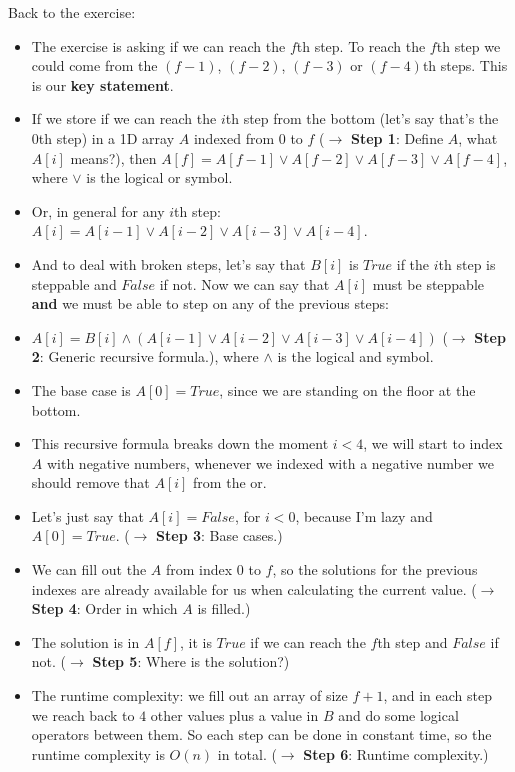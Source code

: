 Back to the exercise:

\begin{itemize}
    \item The exercise is asking if we can reach the $f$th step. To reach the $f$th step we could come from the $(f-1)$, $(f-2)$, $(f-3)$ or $(f-4)$th steps. This is our \textbf{key statement}.
    \item If we store if we can reach the $i$th step from the bottom (let's say that's the 0th step) in a 1D array $A$ indexed from $0$ to $f$ ($\rightarrow$ \textbf{Step 1}: Define $A$, what $A[i]$ means?), then $A[f] = A[f-1] \lor{} A[f-2] \lor{} A[f-3] \lor{} A[f-4]$, where $\lor{}$ is the logical or symbol.
    \item Or, in general for any $i$th step: $A[i] = A[i-1] \lor{} A[i-2] \lor{} A[i-3] \lor{} A[i-4]$.
    \item And to deal with broken steps, let's say that $B[i]$ is $True$ if the $i$th step is steppable and $False$ if not. Now we can say that $A[i]$ must be steppable \textbf{and} we must be able to step on any of the previous steps:
    \item $A[i] = B[i]\land{}(A[i-1] \lor{} A[i-2] \lor{} A[i-3] \lor{} A[i-4])$ ($\rightarrow$ \textbf{Step 2}: Generic recursive formula.), where $\land{}$ is the logical and symbol.
    \item The base case is $A[0] = True$, since we are standing on the floor at the bottom.
    \item This recursive formula breaks down the moment $i<4$, we will start to index $A$ with negative numbers, whenever we indexed with a negative number we should remove that $A[i]$ from the or.
    \item Let's just say that $A[i] = False$, for $i<0$, because I'm lazy and $A[0] = True$. ($\rightarrow$ \textbf{Step 3}: Base cases.)
    \item We can fill out the $A$ from index $0$ to $f$, so the solutions for the previous indexes are already available for us when calculating the current value. ($\rightarrow$ \textbf{Step 4}: Order in which $A$ is filled.)
    \item The solution is in $A[f]$, it is $True$ if we can reach the $f$th step and $False$ if not. ($\rightarrow$ \textbf{Step 5}: Where is the solution?)
    \item The runtime complexity: we fill out an array of size $f+1$, and in each step we reach back to $4$ other values plus a value in $B$ and do some logical operators between them. So each step can be done in constant time, so the runtime complexity is $O(n)$ in total. ($\rightarrow$ \textbf{Step 6}: Runtime complexity.)
\end{itemize}

